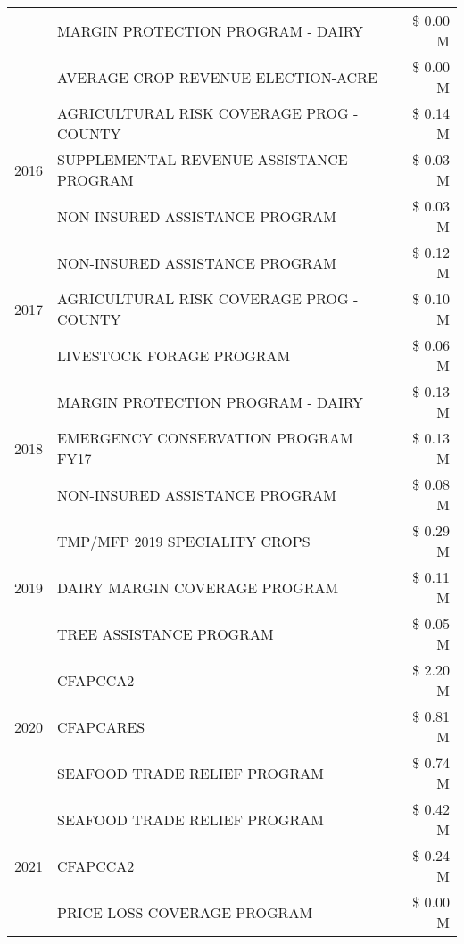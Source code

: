 \begin{tabular}{llr}
 & MARGIN PROTECTION PROGRAM - DAIRY & \$ 0.00 M \\
 & AVERAGE CROP REVENUE ELECTION-ACRE & \$ 0.00 M \\
\cline{1-3}
\multirow[t]{3}{*}{2016} & AGRICULTURAL RISK COVERAGE PROG - COUNTY & \$ 0.14 M \\
 & SUPPLEMENTAL REVENUE ASSISTANCE PROGRAM & \$ 0.03 M \\
 & NON-INSURED ASSISTANCE PROGRAM & \$ 0.03 M \\
\cline{1-3}
\multirow[t]{3}{*}{2017} & NON-INSURED ASSISTANCE PROGRAM & \$ 0.12 M \\
 & AGRICULTURAL RISK COVERAGE PROG - COUNTY & \$ 0.10 M \\
 & LIVESTOCK FORAGE PROGRAM & \$ 0.06 M \\
\cline{1-3}
\multirow[t]{3}{*}{2018} & MARGIN PROTECTION PROGRAM - DAIRY & \$ 0.13 M \\
 & EMERGENCY CONSERVATION PROGRAM FY17 & \$ 0.13 M \\
 & NON-INSURED ASSISTANCE PROGRAM & \$ 0.08 M \\
\cline{1-3}
\multirow[t]{3}{*}{2019} & TMP/MFP 2019 SPECIALITY CROPS & \$ 0.29 M \\
 & DAIRY MARGIN COVERAGE PROGRAM & \$ 0.11 M \\
 & TREE ASSISTANCE PROGRAM & \$ 0.05 M \\
\cline{1-3}
\multirow[t]{3}{*}{2020} & CFAPCCA2 & \$ 2.20 M \\
 & CFAPCARES & \$ 0.81 M \\
 & SEAFOOD TRADE RELIEF PROGRAM & \$ 0.74 M \\
\cline{1-3}
\multirow[t]{3}{*}{2021} & SEAFOOD TRADE RELIEF PROGRAM & \$ 0.42 M \\
 & CFAPCCA2 & \$ 0.24 M \\
 & PRICE LOSS COVERAGE PROGRAM & \$ 0.00 M \\
\cline{1-3}
\bottomrule
\end{tabular}
